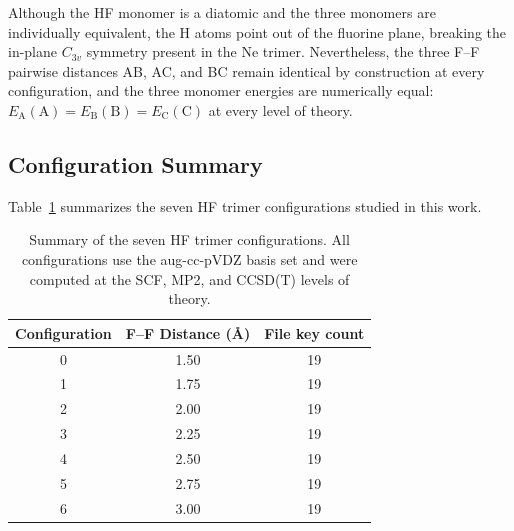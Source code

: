 Although the HF monomer is a diatomic and the three monomers are
individually equivalent, the H atoms point out of the fluorine plane,
breaking the in-plane $C_{3v}$ symmetry present in the Ne trimer.
Nevertheless, the three F--F pairwise distances AB, AC, and BC remain
identical by construction at every configuration, and the three
monomer energies are numerically equal:
$E_\text{A}(\text{A}) = E_\text{B}(\text{B}) = E_\text{C}(\text{C})$
at every level of theory.

\subsection{Configuration Summary}

Table~\ref{tab:hf_trimer_configs} summarizes the seven HF trimer
configurations studied in this work.

\begin{table}[!ht]
    \centering
    \caption{Summary of the seven HF trimer configurations.
    All configurations use the aug-cc-pVDZ basis set and were computed
    at the SCF, MP2, and CCSD(T) levels of theory.}
    \label{tab:hf_trimer_configs}
    \begin{tabular}{ccc}
        \toprule
        Configuration & F--F Distance (\AA) & File key count \\
        \midrule
        0 & 1.50 & 19 \\
        1 & 1.75 & 19 \\
        2 & 2.00 & 19 \\
        3 & 2.25 & 19 \\
        4 & 2.50 & 19 \\
        5 & 2.75 & 19 \\
        6 & 3.00 & 19 \\
        \bottomrule
    \end{tabular}
\end{table}